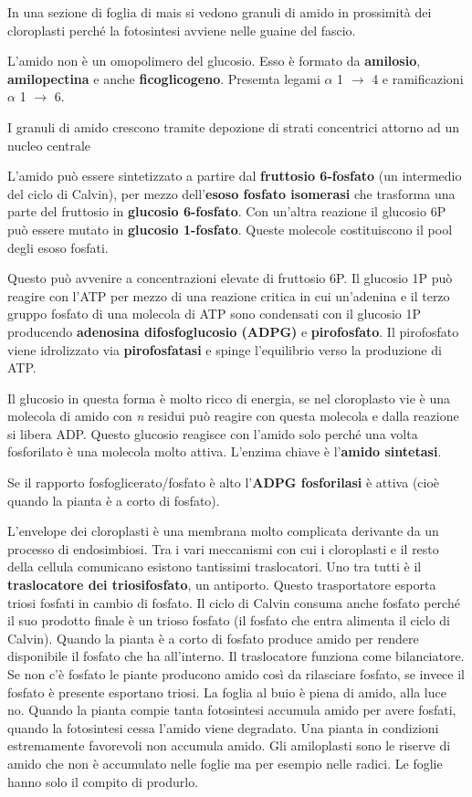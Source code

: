 \documentclass[]{article}
\begin{document}
In una sezione di foglia di mais si vedono granuli di amido in
prossimità dei cloroplasti perché la fotosintesi avviene nelle guaine
del fascio.

L'amido non è un omopolimero del glucosio. Esso è formato da
\textbf{amilosio}, \textbf{amilopectina} e anche \textbf{ficoglicogeno}.
Presemta legami $\alpha$ 1 $\rightarrow$ 4 e ramificazioni $\alpha$ 1
$\rightarrow$ 6.

I granuli di amido crescono tramite depozione di strati concentrici
attorno ad un nucleo centrale

L'amido può essere sintetizzato a partire dal \textbf{fruttosio
6-fosfato} (un intermedio del ciclo di Calvin), per mezzo
dell'\textbf{esoso fosfato isomerasi} che trasforma una parte del
fruttosio in \textbf{glucosio 6-fosfato}. Con un'altra reazione il
glucosio 6P può essere mutato in \textbf{glucosio 1-fosfato}. Queste
molecole costituiscono il pool degli esoso fosfati.

Questo può avvenire a concentrazioni elevate di fruttosio 6P. Il
glucosio 1P può reagire con l'ATP per mezzo di una reazione critica in
cui un'adenina e il terzo gruppo fosfato di una molecola di ATP sono
condensati con il glucosio 1P producendo \textbf{adenosina
difosfoglucosio (ADPG)} e \textbf{pirofosfato}. Il pirofosfato viene
idrolizzato via \textbf{pirofosfatasi} e spinge l'equilibrio verso la
produzione di ATP.

Il glucosio in questa forma è molto ricco di energia, se nel cloroplasto
vie è una molecola di amido con \emph{n} residui può reagire con questa
molecola e dalla reazione si libera ADP. Questo glucosio reagisce con
l'amido solo perché una volta fosforilato è una molecola molto attiva.
L'enzima chiave è l'\textbf{amido sintetasi}.

Se il rapporto fosfoglicerato/fosfato è alto l'\textbf{ADPG fosforilasi}
è attiva (cioè quando la pianta è a corto di fosfato).

L'envelope dei cloroplasti è una membrana molto complicata derivante da
un processo di endosimbiosi. Tra i vari meccanismi con cui i cloroplasti
e il resto della cellula comunicano esistono tantissimi traslocatori.
Uno tra tutti è il \textbf{traslocatore dei triosifosfato}, un
antiporto. Questo trasportatore esporta triosi fosfati in cambio di
fosfato. Il ciclo di Calvin consuma anche fosfato perché il suo prodotto
finale è un trioso fosfato (il fosfato che entra alimenta il ciclo di
Calvin). Quando la pianta è a corto di fosfato produce amido per rendere
disponibile il fosfato che ha all'interno. Il traslocatore funziona come
bilanciatore. Se non c'è fosfato le piante producono amido così da
rilasciare fosfato, se invece il fosfato è presente esportano triosi. La
foglia al buio è piena di amido, alla luce no. Quando la pianta compie
tanta fotosintesi accumula amido per avere fosfati, quando la
fotosintesi cessa l'amido viene degradato. Una pianta in condizioni
estremamente favorevoli non accumula amido. Gli amiloplasti sono le
riserve di amido che non è accumulato nelle foglie ma per esempio nelle
radici. Le foglie hanno solo il compito di produrlo.
\end{document}
